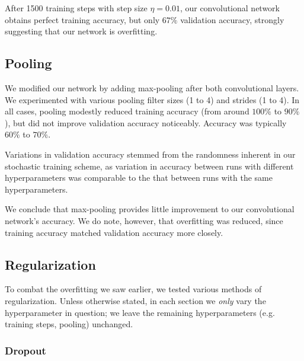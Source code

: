 \documentclass{article}
\begin{document}
\begin{multicols}{2}
After 1500 training steps with step size $\eta = 0.01$,
our convolutional network obtains perfect training accuracy,
but only $67\%$ validation accuracy,
strongly suggesting that our network is overfitting.

\subsection{Pooling}

We modified our network by adding max-pooling
after both convolutional layers.
We experimented with various pooling filter sizes (1 to 4)
and strides (1 to 4).
In all cases,
pooling modestly reduced training accuracy
(from around $100\%$ to $90\%$),
but did not improve validation accuracy noticeably.
Accuracy was typically $60\%$ to $70\%$.

Variations in validation accuracy
stemmed from the randomness inherent in our stochastic training scheme,
as variation in accuracy between runs with different hyperparameters
was comparable to the that between runs with the same hyperparameters.

We conclude that max-pooling provides little improvement
to our convolutional network's accuracy.
We do note, however, that overfitting was reduced,
since training accuracy matched validation accuracy more closely.

\subsection{Regularization}

To combat the overfitting we saw earlier,
we tested various methods of regularization.
Unless otherwise stated,
in each section we \emph{only} vary the hyperparameter in question;
we leave the remaining hyperparameters (e.g. training steps, pooling) unchanged.


\subsubsection{Dropout}



\end{multicols}
\end{document}
